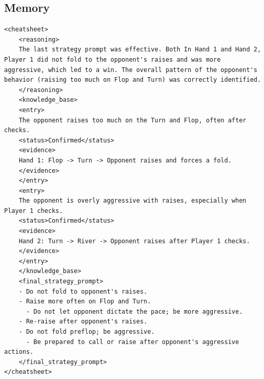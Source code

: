 \documentclass{article}
\theoremstyle{plain}
\theoremstyle{definition}
\theoremstyle{remark}
\begin{document}
\begin{tcolorbox}[breakable]
\subsection*{Memory }
\vspace{-5pt}
\begin{lstlisting}[basicstyle=\scriptsize\ttfamily, breaklines=true]
<cheatsheet> 
	<reasoning> 
	The last strategy prompt was effective. Both In Hand 1 and Hand 2, Player 1 did not fold to the opponent's raises and was more aggressive, which led to a win. The overall pattern of the opponent's behavior (raising too much on Flop and Turn) was correctly identified. 
	</reasoning> 
	<knowledge_base> 
	<entry> 
	The opponent raises too much on the Turn and Flop, often after checks. 
	<status>Confirmed</status> 
	<evidence>
	Hand 1: Flop -> Turn -> Opponent raises and forces a fold.
	</evidence> 
	</entry> 
	<entry> 
	The opponent is overly aggressive with raises, especially when Player 1 checks. 
	<status>Confirmed</status> 
	<evidence>
	Hand 2: Turn -> River -> Opponent raises after Player 1 checks.
	</evidence> 
	</entry> 
	</knowledge_base> 
	<final_strategy_prompt> 
	- Do not fold to opponent's raises. 
	- Raise more often on Flop and Turn.
	  - Do not let opponent dictate the pace; be more aggressive. 
	- Re-raise after opponent's raises. 
	- Do not fold preflop; be aggressive.
	  - Be prepared to call or raise after opponent's aggressive actions. 
	</final_strategy_prompt> 
</cheatsheet>
\end{lstlisting}
\end{tcolorbox}
\end{document}
